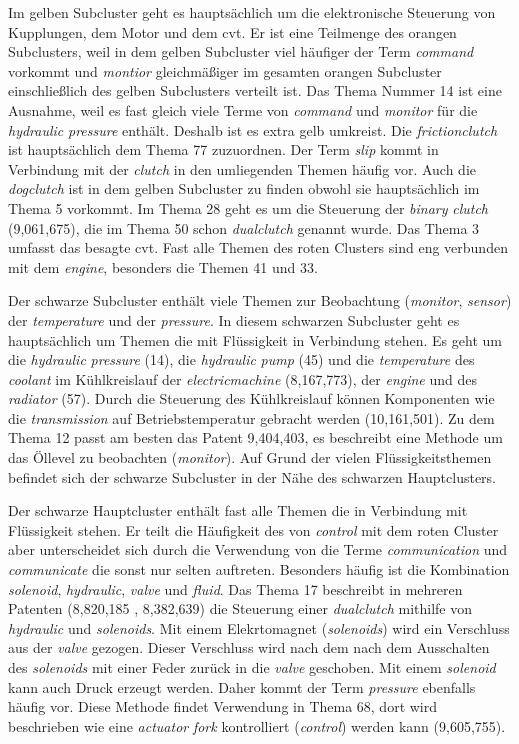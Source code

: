 Im gelben Subcluster geht es hauptsächlich um die elektronische Steuerung von Kupplungen, dem Motor und dem \gls{cvt}. Er ist eine Teilmenge des orangen Subclusters, weil in dem gelben Subcluster viel häufiger der Term \emph{command} vorkommt und \emph{montior} gleichmäßiger im gesamten orangen Subcluster einschließlich des gelben Subclusters verteilt ist. Das Thema Nummer 14 ist eine Ausnahme, weil es fast gleich viele Terme von \emph{command} und \emph{monitor} für die \emph{hydraulic} \emph{pressure} enthält. Deshalb ist es extra gelb umkreist. Die \emph{frictionclutch} ist hauptsächlich dem Thema 77 zuzuordnen. Der Term \emph{slip} kommt in Verbindung mit der \emph{clutch} in den umliegenden Themen häufig vor. Auch die \emph{dogclutch} ist in dem gelben Subcluster zu finden obwohl sie hauptsächlich im Thema 5 vorkommt. Im Thema 28 geht es um die Steuerung der \emph{binary} \emph{clutch} (9,061,675), die im Thema 50 schon \emph{dualclutch} genannt wurde. Das Thema 3 umfasst das besagte \gls{cvt}. Fast alle Themen des roten Clusters sind eng verbunden mit dem \emph{engine}, besonders die Themen 41 und 33.
 
Der schwarze Subcluster enthält viele Themen zur Beobachtung (\emph{monitor}, \emph{sensor}) der \emph{temperature} und der \emph{pressure}. In diesem schwarzen Subcluster geht es hauptsächlich um Themen die mit Flüssigkeit in Verbindung stehen. Es geht um die \emph{hydraulic} \emph{pressure} (14), die \emph{hydraulic} \emph{pump} (45) und die \emph{temperature} des \emph{coolant} im Kühlkreislauf der \emph{electricmachine} (8,167,773), der \emph{engine} und des \emph{radiator} (57). Durch die Steuerung des Kühlkreislauf können Komponenten wie die \emph{transmission} auf Betriebstemperatur gebracht werden (10,161,501). Zu dem Thema 12 passt am besten das Patent 9,404,403, es beschreibt eine Methode um das Öllevel zu beobachten (\emph{monitor}). Auf Grund der vielen Flüssigkeitsthemen befindet sich der schwarze Subcluster in der Nähe des schwarzen Hauptclusters.
 
Der schwarze Hauptcluster enthält fast alle Themen die in Verbindung mit Flüssigkeit stehen. Er teilt die Häufigkeit des von \emph{control} mit dem roten Cluster aber unterscheidet sich durch die Verwendung von die Terme \emph{communication} und \emph{communicate} die sonst nur selten auftreten. Besonders häufig ist die Kombination \emph{solenoid}, \emph{hydraulic}, \emph{valve} und \emph{fluid}. Das Thema 17 beschreibt in mehreren Patenten (8,820,185
, 8,382,639) die Steuerung einer \emph{dualclutch} mithilfe von \emph{hydraulic} und \emph{solenoids}. Mit einem Elekrtomagnet (\emph{solenoids}) wird ein Verschluss aus der \emph{valve} gezogen. Dieser Verschluss wird nach dem nach dem Ausschalten des \emph{solenoids} mit einer Feder zurück in die \emph{valve} geschoben. Mit einem \emph{solenoid} kann auch Druck erzeugt werden. Daher kommt der Term \emph{pressure} ebenfalls häufig vor. Diese Methode findet Verwendung in Thema 68, dort wird beschrieben wie eine \emph{actuator} \emph{fork} kontrolliert (\emph{control}) werden kann (9,605,755).

